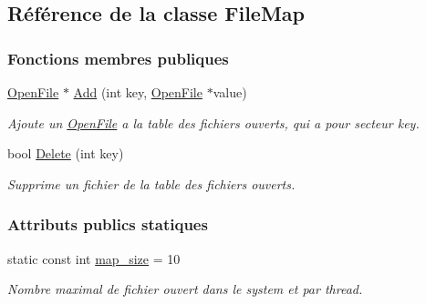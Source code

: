 \hypertarget{class_file_map}{}\subsection{Référence de la classe File\+Map}
\label{class_file_map}
\subsubsection*{Fonctions membres publiques}
\begin{DoxyCompactItemize}
\item 
\hyperlink{class_open_file}{Open\+File} $\ast$ \hyperlink{class_file_map_acf17cb5b602e4139ed3d30c11e11751f}{Add} (int key, \hyperlink{class_open_file}{Open\+File} $\ast$value)
\begin{DoxyCompactList}\small\item\em Ajoute un \hyperlink{class_open_file}{Open\+File} a la table des fichiers ouverts, qui a pour secteur key. \end{DoxyCompactList}\item 
bool \hyperlink{class_file_map_ab6d2e0d0c522ed4f6bcd9c7788db8ac5}{Delete} (int key)
\begin{DoxyCompactList}\small\item\em Supprime un fichier de la table des fichiers ouverts. \end{DoxyCompactList}\end{DoxyCompactItemize}
\subsubsection*{Attributs publics statiques}
\begin{DoxyCompactItemize}
\item 
\hypertarget{class_file_map_af5bd9ace733c982f93ab41ab482d90d0}{}\label{class_file_map_af5bd9ace733c982f93ab41ab482d90d0} 
static const int \hyperlink{class_file_map_af5bd9ace733c982f93ab41ab482d90d0}{map\+\_\+size} = 10
\begin{DoxyCompactList}\small\item\em Nombre maximal de fichier ouvert dans le system et par thread. \end{DoxyCompactList}\end{DoxyCompactItemize}
